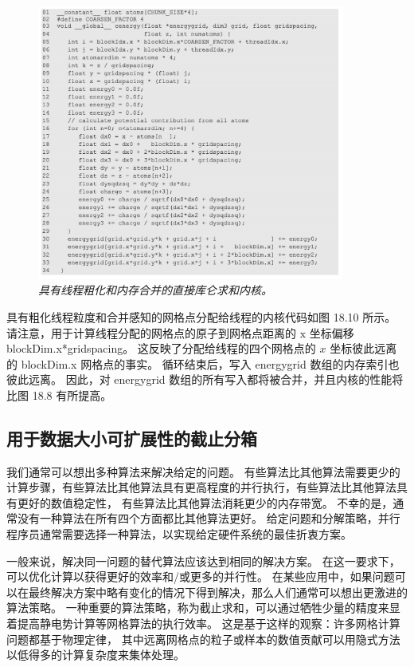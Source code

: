 \begin{figure}[H]
	\centering
	\includegraphics[width=0.9\textwidth]{figs/F18.10.png}
	\caption{\textit{具有线程粗化和内存合并的直接库仑求和内核。}}
\end{figure}

具有粗化线程粒度和合并感知的网格点分配给线程的内核代码如图 18.10 所示。 
请注意，用于计算线程分配的网格点的原子到网格点距离的 $\mathrm{x}$ 坐标偏移 blockDim.x*gridspacing。 
这反映了分配给线程的四个网格点的 $x$ 坐标彼此远离的 blockDim.x 网格点的事实。 
循环结束后，写入 energygrid 数组的内存索引也彼此远离。 
因此，对 energygrid 数组的所有写入都将被合并，并且内核的性能将比图 18.8 有所提高。

\subsection{用于数据大小可扩展性的截止分箱}
我们通常可以想出多种算法来解决给定的问题。 
有些算法比其他算法需要更少的计算步骤，有些算法比其他算法具有更高程度的并行执行，有些算法比其他算法具有更好的数值稳定性，
有些算法比其他算法消耗更少的内存带宽。 不幸的是，通常没有一种算法在所有四个方面都比其他算法更好。 
给定问题和分解策略，并行程序员通常需要选择一种算法，以实现给定硬件系统的最佳折衷方案。

一般来说，解决同一问题的替代算法应该达到相同的解决方案。 在这一要求下，可以优化计算以获得更好的效率和/或更多的并行性。 
在某些应用中，如果问题可以在最终解决方案中略有变化的情况下得到解决，那么人们通常可以想出更激进的算法策略。 
一种重要的算法策略，称为截止求和，可以通过牺牲少量的精度来显着提高静电势计算等网格算法的执行效率。 
这是基于这样的观察：许多网格计算问题都基于物理定律，
其中远离网格点的粒子或样本的数值贡献可以用隐式方法以低得多的计算复杂度来集体处理。

